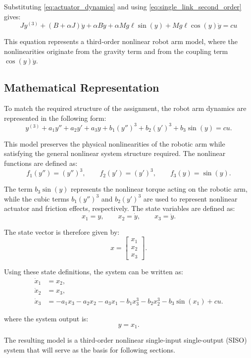 \noindent Substituting \eqref{eq:actuator_dynamics} and using \eqref{eq:single_link_second_order} gives:
\begin{equation}
J y^{(3)}
+
(B+\alpha J)\ddot{y}
+
\alpha B\dot{y}
+
\alpha Mg\ell \sin(y)
+
Mg\ell\cos(y)\dot{y}
=
cu
\label{eq:derived_third_order}
\end{equation}

\noindent This equation represents a third-order nonlinear robot arm model, where the nonlinearities originate from the gravity term and from the coupling term \(\cos(y)\dot{y}\).

\subsection{Mathematical Representation}

To match the required structure of the assignment, the robot arm dynamics are represented in the following form:
\begin{equation}
y^{(3)}
+a_1y''
+a_2y'
+a_3y
+b_1(y'')^3
+b_2(y')^3
+b_3\sin(y)
=
cu .
\label{eq:control_oriented_model}
\end{equation}

\noindent This model preserves the physical nonlinearities of the robotic arm while satisfying the general nonlinear system structure required. The nonlinear functions are defined as:
\begin{equation}
f_1(y'')=(y'')^3,
\qquad
f_2(y')=(y')^3,
\qquad
f_3(y)=\sin(y).
\end{equation}

\noindent The term \(b_3\sin(y)\) represents the nonlinear torque acting on the robotic arm, while the cubic terms \(b_1(y'')^3\) and \(b_2(y')^3\) are used to represent nonlinear actuator and friction effects, respectively. The state variables are defined as:
\begin{equation}
x_1=y,
\qquad
x_2=\dot{y},
\qquad
x_3=\ddot{y}.
\end{equation}

\noindent The state vector is therefore given by:
\begin{equation}
x=
\begin{bmatrix}
x_1\\
x_2\\
x_3
\end{bmatrix}.
\end{equation}

\noindent Using these state definitions, the system can be written as:
\begin{align}
\dot{x}_1 &= x_2,\\
\dot{x}_2 &= x_3,\\
\dot{x}_3 &=
-a_1x_3
-a_2x_2
-a_3x_1
-b_1x_3^3
-b_2x_2^3
-b_3\sin(x_1)
+cu.
\end{align}

where the system output is:
\begin{equation}
y=x_1.
\end{equation}

\noindent The resulting model is a third-order nonlinear single-input single-output (SISO) system that will serve as the basis for following sections.

\bigskip